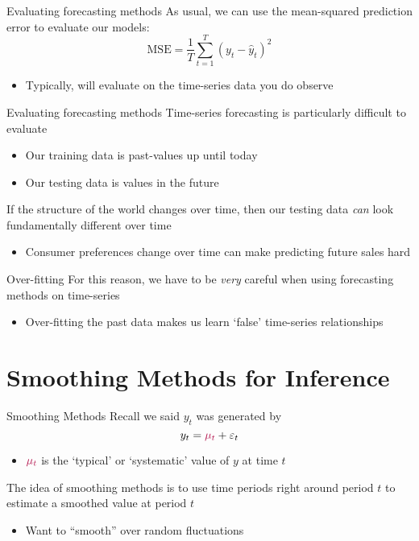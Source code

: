 \documentclass[aspectratio=169,t,11pt,table]{beamer}
\begin{document}
\begin{frame}{Evaluating forecasting methods}
  As usual, we can use the mean-squared prediction error to evaluate our models:
  $$
    \text{MSE} = \frac{1}{T} \sum_{t=1}^T (y_t - \hat{y}_t)^2
  $$

  \begin{itemize}
    \item Typically, will evaluate on the time-series data you do observe
  \end{itemize}
\end{frame}

\begin{frame}{Evaluating forecasting methods}
  Time-series forecasting is particularly difficult to evaluate
  \begin{itemize}
    \item Our training data is past-values up until today
    \item Our testing data is values in the future
  \end{itemize}

  \bigskip
  If the structure of the world changes over time, then our testing data \emph{can} look fundamentally different over time
  \begin{itemize}
    \item Consumer preferences change over time can make predicting future sales hard
  \end{itemize}
\end{frame}

\begin{frame}{Over-fitting}
  For this reason, we have to be \emph{very} careful when using forecasting methods on time-series
  \begin{itemize}
    \item Over-fitting the past data makes us learn `false' time-series relationships
  \end{itemize}
\end{frame}

\section{Smoothing Methods for Inference}

\begin{frame}{Smoothing Methods}
  Recall we said $y_t$ was generated by 
  $$
    y_t = {\color[HTML]{B3114B} \mu_t} + \varepsilon_t
  $$
  \begin{itemize}
    \item ${\color[HTML]{B3114B} \mu_t}$ is the `typical' or `systematic' value of $y$ at time $t$
  \end{itemize}

  \bigskip
  The idea of \alert{smoothing methods} is to use time periods right around period $t$ to estimate a smoothed value at period $t$
  \begin{itemize}
    \item Want to ``smooth'' over random fluctuations 
  \end{itemize}
\end{frame}
\end{document}

